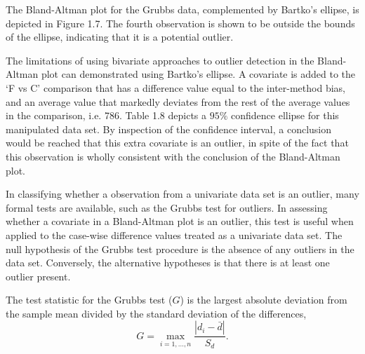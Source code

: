 \documentclass[12pt, a4paper]{report}
\theoremstyle{plain}
\theoremstyle{definition}
\theoremstyle{remark}
\begin{document}
	
	
	The Bland-Altman plot for the Grubbs data, complemented by Bartko's ellipse, is depicted in Figure 1.7.
	The fourth observation is shown to be outside the bounds of the ellipse, indicating that it is a potential outlier.
	
	
	
	The limitations of using bivariate approaches to outlier detection
	in the Bland-Altman plot can demonstrated using Bartko's ellipse.
	A covariate is added to the `F vs C' comparison that has a
	difference value equal to the inter-method bias, and an average
	value that markedly deviates from the rest of the average values
	in the comparison, i.e. 786. Table 1.8 depicts a $95\%$ confidence
	ellipse for this manipulated data set. By inspection of the
	confidence interval, a conclusion would be reached that this extra
	covariate is an outlier, in spite of the fact that this
	observation is wholly consistent with the conclusion of the
	Bland-Altman plot.
	
	

	
	
	In classifying whether a observation from a univariate data set is
	an outlier, many formal tests are available, such as the Grubbs test for outliers. In assessing
	whether a covariate in a Bland-Altman plot is an outlier, this
	test is useful when applied to the case-wise difference values treated as a
	univariate data set. The null hypothesis of the Grubbs test procedure is the absence
	of any outliers in the data set. Conversely, the alternative hypotheses is that there is at least one outlier
	present.
	
	The test statistic for the Grubbs test ($G$) is the largest
	absolute deviation from the sample mean divided by the standard
	deviation of the differences,
	\[
	G =  \displaystyle\max_{i=1,\ldots, n}\frac{\left \vert d_i -
		\bar{d}\right\vert}{S_{d}}.
	\]
	
\end{document}
